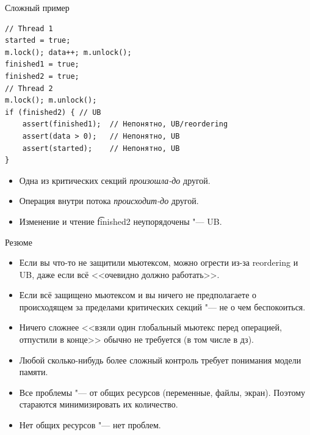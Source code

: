 \begin{frame}[fragile]{Сложный пример}
\begin{verbatim}
// Thread 1
started = true;
m.lock(); data++; m.unlock();
finished1 = true;
finished2 = true;
// Thread 2
m.lock(); m.unlock();
if (finished2) { // UB
    assert(finished1);  // Непонятно, UB/reordering
    assert(data > 0);   // Непонятно, UB
    assert(started);    // Непонятно, UB
}
\end{verbatim}
	\begin{itemize}
	\item Одна из критических секций \textit{произошла-до} другой.
	\item Операция внутри потока \textit{происходит-до} другой.
	\item Изменение и чтение \t{finished2} неупорядочены "--- UB.
	\end{itemize}
\end{frame}

\begin{frame}[fragile]{Резюме}
	\begin{itemize}
		\item Если вы что-то не защитили мьютексом, можно огрести из-за reordering и UB, даже если всё <<очевидно должно работать>>.
		\item Если всё защищено мьютексом и вы ничего не предполагаете о происходящем за пределами критических секций "--- не о чем беспокоиться.
		\item Ничего сложнее <<взяли один глобальный мьютекс перед операцией, отпустили в конце>> обычно не требуется (в том числе в дз).
		\item Любой сколько-нибудь более сложный контроль требует понимания модели памяти.
		\item
			Все проблемы "--- от общих ресурсов (переменные, файлы, экран).
			Поэтому стараются минимизировать их количество.
		\item Нет общих ресурсов "--- нет проблем.
	\end{itemize}
\end{frame}
